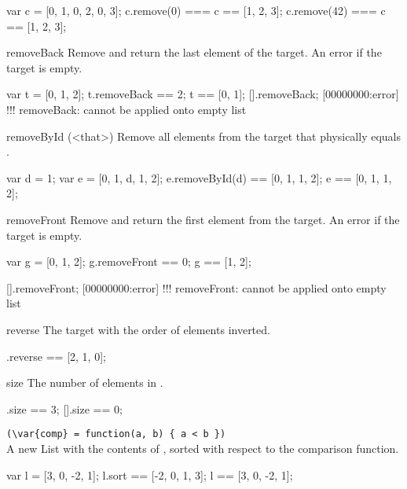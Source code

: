 \begin{urbiscriptapi}
\begin{urbiassert}
var c = [0, 1, 0, 2, 0, 3];
c.remove(0)  === c ==  [1, 2, 3];
c.remove(42) === c ==  [1, 2, 3];
\end{urbiassert}


\item[removeBack]
  Remove and return the last element of the target. An error if the
  target is empty.

\begin{urbiassert}
var t = [0, 1, 2];
t.removeBack == 2;
t == [0, 1];
[].removeBack;
[00000000:error] !!! removeBack: cannot be applied onto empty list
\end{urbiassert}


\item[removeById](<that>)%
  Remove all elements from the target that physically equals
  .

\begin{urbiassert}
var d = 1;
var e = [0, 1, d, 1, 2];
e.removeById(d) == [0, 1, 1, 2];
e == [0, 1, 1, 2];
\end{urbiassert}


\item[removeFront] Remove and return the first element from the target. An
  error if the target is empty.

\begin{urbiassert}
var g = [0, 1, 2];
g.removeFront == 0;
g == [1, 2];

[].removeFront;
[00000000:error] !!! removeFront: cannot be applied onto empty list
\end{urbiassert}


\item[reverse]
  The target with the order of elements inverted.
\begin{urbiassert}
[0, 1, 2].reverse == [2, 1, 0];
\end{urbiassert}


\item[size]
  The number of elements in \this.
\begin{urbiassert}
[0, 1, 2].size == 3;
[].size == 0;
\end{urbiassert}


\item {}\lstinline|(\var{comp} = function(a, b) { a < b })|\\%
  A new List with the contents of \this, sorted with respect to the
   comparison function.
\begin{urbiassert}
var l = [3, 0, -2, 1];
l.sort == [-2, 0, 1, 3];
l      == [3, 0, -2, 1];


\end{urbiassert}
\end{urbiscriptapi}
